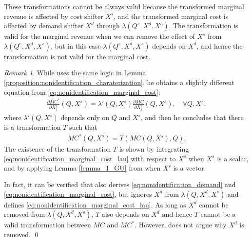 \documentclass[11pt, a4paper]{article}
\theoremstyle{remark}
\newtheorem{remark}{Remark}
\begin{document}
These transformations cannot be always valid because the transformed marginal revenue is affected by cost shifter $X^{s}$, and the transformed marginal cost is affected by demand shifter $X^{d}$ through $\lambda(Q^e, X^{d}, X^{s})$.
The transformation is valid for the marginal revenue when we can remove the effect of $X^{s}$ from $\lambda(Q^e, X^{d}, X^{s})$, but in this case $\lambda(Q^e, X^{d}, X^{s})$ depends on $X^{d}$, and hence the transformation is not valid for the marginal cost.

\begin{remark}\label{remark:lau_argument_transformation}
While \citet{lau1982identifying} uses the same logic in Lemma \ref{proposition:nonidentification_charaterization}, he obtains a slightly different equation from \eqref{eq:nonidentification_marginal_cost}:
\begin{align}
    \frac{\partial MC^{*}}{\partial X^{s}_j}(Q, X^{s}) = \lambda'(Q, X^{s}) \frac{\partial MC}{\partial X^{s}_j}(Q, X^{s}),\quad \forall Q, X^{s}, \label{eq:nonidentification_marginal_cost_lau}
\end{align}
where $\lambda'(Q, X^{s})$ depends only on $Q$ and $X^{s}$, and then he concludes that there is a transformation $T$ such that 
\begin{align}
    MC^{*}(Q, X^{s}) = T(MC(Q, X^{s}), Q). \label{eq:mc_transformation_lau}
\end{align}
The existence of the transformation $T$ is shown by integrating \eqref{eq:nonidentification_marginal_cost_lau} with respect to $X^{s}$ when $X^{s}$ is a scalar, and by applying Lemma \ref{lemma_1_GU} from \citet{goldmanNote1964} when $X^{s}$ is a vector.

In fact, it can be verified that \citet{lau1982identifying} also derives \eqref{eq:nonidentification_demand} and \eqref{eq:nonidentification_marginal_cost}, but ignores $X^{d}$ from $\lambda(Q, X^{d}, X^{s})$ and defines \eqref{eq:nonidentification_marginal_cost_lau}.
As long as $X^{d}$ cannot be removed from $\lambda(Q, X^{d}, X^{s})$, $T$ also depends on $X^{d}$ and hence $T$ cannot be a valid transformation between $MC$ and $MC^{*}$.
However, \citet{lau1982identifying} does not argue why $X^{d}$ is removed.
\qed
\end{remark}
\end{document}
